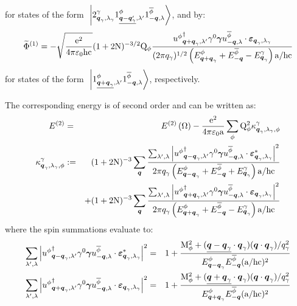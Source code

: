 for states of the form $\ket{\bQ 2 {\photon} {\q_ \photon} {\sp_ \photon} \bQ 1 \pt {\eqp{\q-\q_\photon'}} {\sp'} \bQ 1 {\antiparticle \pt} {-\q} \sp}$, and by:
\begin{equation*}
\FT \Phi^{(1)} = - \sqrt{\frac{\e^2}{4 \pi \vpty \h \c}} ( 1 + 2 \N )^{-3/2} \Qp \pt \frac{\ddirspin \pt {\q + \q_\photon} {\sp'} \gammat 0 \gamvec \dirspin {\antiparticle \pt} {-\q} \sp \ssp \photonspin {\q_\photon} {\sp_\photon}}{( 2 \pi q_\photon )^{1 / 2} \left( \Ek \pt {\q + \q_\photon} + \Ek {\antiparticle \pt} {-\q} - \Ek \photon {\q_\photon} \right) \a / \h \c}
\end{equation*}
for states of the form $\ket{\bQ 1 {\pt} {\eqp{\q + \q_\photon}} {\sp'} \bQ 1 {\antiparticle \pt} {-\q} \sp}$, respectively.

The corresponding energy is of second order and can be written as:
\begin{eqnarray*}
E^{(2)} & = & E^{(2)} \left( \vac \right) - \frac{\e^2}{4 \pi \vpty \a} \sum_{\pt} \Qp \pt^2 \kappa^{\photon}_{\q_\photon,\sp_\photon,\pt} \\
\kappa^{\photon}_{\q_\photon,\sp_\photon,\pt} & \eqdef & ( 1 + 2 \N )^{-3} \sum_{\q} \frac {\sum_{\sp',\sp} \left| \ddirspin \pt {\q - \q_\photon} {\sp'} \gammat 0 \gamvec \dirspin {\antiparticle \pt} {-\q} \sp \ssp \cphotonspin {\q_\photon} {\sp_\photon} \right|^2} {2 \pi q_\photon \left( \Ek \pt {\q - \q_\photon} + \Ek {\antiparticle \pt} {-\q} + \Ek \photon {\q_\photon} \right) \a / \h \c} \\
&& + ( 1 + 2 \N )^{-3} \sum_{\q} \frac {\sum_{\sp',\sp} \left| \ddirspin \pt {\q + \q_\photon} {\sp'} \gammat 0 \gamvec \dirspin {\antiparticle \pt} {-\q} \sp \ssp \photonspin {\q_\photon} {\sp_\photon} \right|^2} {2 \pi q_\photon \left( \Ek \pt {\q + \q_\photon} + \Ek {\antiparticle \pt} {-\q} - \Ek \photon {\q_\photon} \right) \a / \h \c}
\end{eqnarray*}
where the spin summations evaluate to:
\begin{eqnarray*}
\sum_{\sp',\sp} \left| \ddirspin \pt {\q - \q_\photon} {\sp'} \gammat 0 \gamvec \dirspin {\antiparticle \pt} {-\q} \sp \ssp \cphotonspin {\q_\photon} {\sp_\photon} \right|^2 & = & 1 + \frac{\mpr \pt^2 + ( \eqp{\q - \q_\photon} \ssp \q_\photon ) ( \q \ssp \q_\photon ) / q_\photon^2}{\Ek \pt {\q - \q_\photon} \Ek {\antiparticle \pt} {-\q} ( \a / \h \c )^2} \\
\sum_{\sp',\sp} \left| \ddirspin \pt {\q + \q_\photon} {\sp'} \gammat 0 \gamvec \dirspin {\antiparticle \pt} {-\q} \sp \ssp \photonspin {\q_\photon} {\sp_\photon} \right|^2 & = & 1 + \frac{\mpr \pt^2 + ( \eqp{\q + \q_\photon} \ssp \q_\photon ) ( \q \ssp \q_\photon ) / q_\photon^2}{\Ek \pt {\q + \q_\photon} \Ek {\antiparticle \pt} {-\q} ( \a / \h \c )^2}
\end{eqnarray*}
